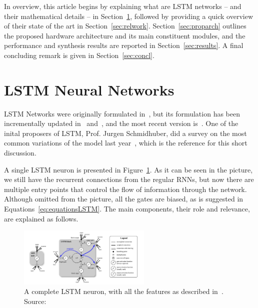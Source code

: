 \documentclass{IEEEtran}
\begin{document}
In overview, this article begins by explaining what are LSTM networks -- and their mathematical
details -- in Section~\ref{sec:lstmnn}, followed by providing a quick overview of their state
of the art in Section~\ref{sec:relwork}. Section~\ref{sec:proparch} outlines the proposed
hardware architecture and its main constituent modules, and the performance and synthesis
results are reported in Section~\ref{sec:results}. A final concluding remark is given in
Section~\ref{sec:concl}.

\section{LSTM Neural Networks}\label{sec:lstmnn}
LSTM Networks were originally formulated in~\cite{Hoch97}, but its formulation has been incrementally
updated in~\cite{Gers00} and~\cite{Gers2000}, and the most recent version is~\cite{Graves05}.
One of the inital proposers of LSTM, Prof. Jurgen Schmidhuber, did a survey on the most common variations
of the model last year~\cite{Greff15}, which is the reference for this short discussion.

A single LSTM neuron is presented in Figure~\ref{fig:lstmneuron}. As it can be seen in the picture,
we still have the recurrent connections from the regular RNNs, but now there are multiple entry points
that control the flow of information through the network. Although omitted from the picture, all the
gates are biased, as is suggested in Equations~\ref{eq:equationsLSTM}. The main components, their
role and relevance, are explained as follows.

\begin{figure}[!t]
	\centering
	\includegraphics[width=2.5in]{figures/lstmneuron.png}
    \caption{A complete LSTM neuron, with all the features as described in~\cite{Graves05}. Source:~\cite{Greff15}}
	\label{fig:lstmneuron}
\end{figure}
\end{document}
